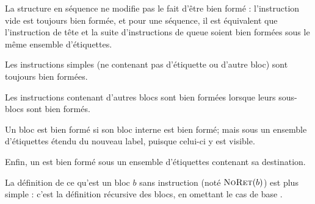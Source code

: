 \begin{mathpar}
\end{mathpar}

La structure en séquence ne modifie pas le fait d'être bien formé :
l'instruction vide est toujours bien formée, et pour une séquence, il est
équivalent que l'instruction de tête et la suite d'instructions de queue soient
bien formées sous le même ensemble d'étiquettes.


Les instructions simples (ne contenant pas d'étiquette ou d'autre bloc) sont
toujours bien formées.


Les instructions contenant d'autres blocs sont bien formées lorsque leurs
sous-blocs sont bien formés.


Un bloc \phxx{\npkDoWith} est bien formé si son bloc interne est bien formé;
mais sous un ensemble d'étiquettes étendu du nouveau label, puisque celui-ci y
est visible.

\begin{mathpar}
\end{mathpar}

Enfin, un \phx{\npkGoto} est bien formé sous un ensemble d'étiquettes contenant
sa destination.

\begin{mathpar}
\end{mathpar}

La définition de ce qu'est un bloc $b$ sans instruction \phx{\npkReturn} (noté
$\NORET{b}$) est plus simple : c'est la définition récursive des blocs, en
omettant le cas de base \phx{\npkReturn}.

